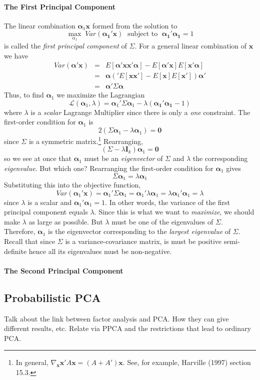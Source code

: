 \documentclass[12pt]{article}
\theoremstyle{definition}
\begin{document}
\paragraph{The First Principal Component} The linear combination $\boldsymbol{\alpha}_1 \mathbf{x}$ formed from the solution to
	$$\max_{\alpha_1} \; Var(\boldsymbol{\alpha_1}'\mathbf{x})\;  \mbox{ subject to } \; \boldsymbol{\alpha_1}' \boldsymbol{\alpha_1} = 1$$
is called the \emph{first principal component} of $\Sigma$. For a general linear combination of $\mathbf{x}$ we have
	\begin{eqnarray*}
		Var(\boldsymbol{\alpha}'\mathbf{x}) &=& E[\boldsymbol{\alpha}'\mathbf{x}\mathbf{x}'\boldsymbol{\alpha}] - E[\boldsymbol{\alpha}'\mathbf{x}]E[\mathbf{x}'\boldsymbol{\alpha}]\\
			&=& \boldsymbol{\alpha}\left('E[\mathbf{x}\mathbf{x}'] - E[\mathbf{x}]E[\mathbf{x}'] \right)\boldsymbol{\alpha}'\\
			&=& \boldsymbol{\alpha}' \Sigma \boldsymbol{\alpha}
	\end{eqnarray*}
Thus, to find $\boldsymbol{\alpha}_1$ we maximize the Lagrangian
	$$\mathcal{L}(\boldsymbol{\alpha}_1 ,\lambda) = \boldsymbol{\alpha}_1'\Sigma \boldsymbol{\alpha}_1 - \lambda(\boldsymbol{\alpha_1}' \boldsymbol{\alpha_1}  - 1)$$
where $\lambda$ is a \emph{scalar} Lagrange Multiplier since there is only a \emph{one} constraint. The first-order condition for $\mathbf{\alpha}_1$ is
$$2(\Sigma \boldsymbol{\alpha}_1 - \lambda \boldsymbol{\alpha}_1) = \textbf{0}$$
since $\Sigma$ is a symmetric matrix.\footnote{In general, $\nabla_{\mathbf{x}} \mathbf{x}' A \mathbf{x} = (A + A')\mathbf{x}$. See, for example, Harville (1997) section 15.3.} Rearranging,
	$$(\Sigma - \lambda \textbf{I}_k)\boldsymbol{\alpha}_1 = \textbf{0}$$
so we see at once that $\boldsymbol{\alpha}_1$ must be an \emph{eigenvector} of $\Sigma$ and $\lambda$ the corresponding \emph{eigenvalue}. But which one? Rearranging the first-order condition for $\boldsymbol{\alpha}_1$ gives
	$$\Sigma \boldsymbol{\alpha}_1 = \lambda \boldsymbol{\alpha}_1$$
Substituting this into the objective function, 
	$$Var(\boldsymbol{\alpha}_1' \textbf{x}) =  \boldsymbol{\alpha}_1' \Sigma \boldsymbol{\alpha}_1 = \boldsymbol{\alpha}_1' \lambda \boldsymbol{\alpha}_1 = \lambda \boldsymbol{\alpha}_1' \boldsymbol{\alpha}_1 = \lambda$$
since $\lambda$ is a scalar and $\boldsymbol{\alpha}_1' \boldsymbol{\alpha}_1 = 1$. In other words, the variance of the first principal component equals $\lambda$. Since this is what we want to \emph{maximize}, we should make $\lambda$ as large as possible. But $\lambda$ must be one of the eigenvalues of $\Sigma$. Therefore, $\boldsymbol{\alpha}_1$ is the eigenvector corresponding to the \emph{largest eigenvalue} of $\Sigma$. Recall that since $\Sigma$ is a variance-covariance matrix, is must be positive semi-definite hence all its eigenvalues must be non-negative.

\paragraph{The Second Principal Component}


\subsection{Probabilistic PCA}
Talk about the link between factor analysis and PCA. How they can give different results, etc. Relate via PPCA and the restrictions that lead to ordinary PCA.
\end{document}
